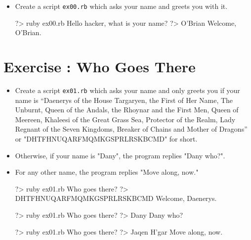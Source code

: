 \documentclass{42-en}
\begin{document}

\begin{itemize}

\item Create a script \texttt{ex00.rb} which asks your name and greets you with it.

\begin{42console}
	?> ruby ex00.rb
	Hello hacker, what is your name?
	?> O'Brian
	Welcome, O'Brian.
\end{42console}

\end{itemize}



\chapter{Exercise \exercicenumber: Who Goes There}

\exnumber{\exercicenumber}


\begin{itemize}

\item Create a script \texttt{ex01.rb} which asks your name and only greets you if your name is “Daenerys of the House Targaryen, the First of Her Name, The Unburnt, Queen of the Andals, the Rhoynar and the First Men, Queen of Meereen, Khaleesi of the Great Grass Sea, Protector of the Realm, Lady Regnant of the Seven Kingdoms, Breaker of Chains and Mother of Dragons” or "DHTFHNUQARFMQMKGSPRLRSKBCMD" for short. 
\item Otherwise, if your name is "Dany", the program replies "Dany who?". 
\item For any other name, the program replies "Move along, now."

\begin{42console}
	?> ruby ex01.rb
	Who goes there?
	?> DHTFHNUQARFMQMKGSPRLRSKBCMD
	Welcome, Daenerys.
\end{42console}

\begin{42console}
	?> ruby ex01.rb
	Who goes there?
	?> Dany
	Dany who?
\end{42console}

\begin{42console}
	?> ruby ex01.rb
	Who goes there?
	?> Jaqen H'gar
	Move along, now.
\end{42console}

\end{itemize}
\end{document}
